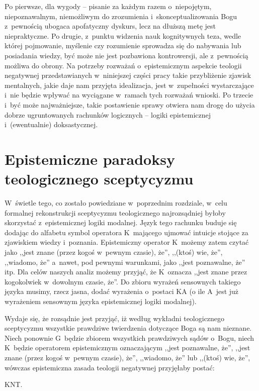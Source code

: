 Po pierwsze, dla wygody -- pisanie za każdym razem o~niepojętym, niepoznawalnym, niemożliwym do zrozumienia i~skonceptualizowania Bogu z~pewnością ubogaca apofatyczny dyskurs, lecz na dłuższą metę jest niepraktyczne. Po drugie, z~punktu widzenia nauk kognitywnych teza, wedle której pojmowanie, myślenie czy rozumienie sprowadza się do nabywania lub posiadania wiedzy, być może nie jest pozbawiona kontrowersji, ale z~pewnością możliwa do obrony. Na potrzeby rozważań o~epistemicznym aspekcie teologii negatywnej przedstawianych w~niniejszej części pracy takie przybliżenie zjawisk mentalnych, jakie daje nam przyjęta idealizacja, jest w~zupełności wystarczające i~nie będzie wpływać na wyciągane w~ramach tych rozważań wnioski. Po trzecie i~być może najważniejsze, takie postawienie sprawy otwiera nam drogę do użycia dobrze ugruntowanych rachunków logicznych -- logiki epistemicznej i~(ewentualnie) doksastycznej.


\chapter{Epistemiczne paradoksy teologicznego sceptycyzmu}

W~świetle tego, co zostało powiedziane w~poprzednim rozdziale, w~celu formalnej rekonstrukcji sceptycyzmu teologicznego najrozsądniej byłoby skorzystać z~epistemicznej logiki modalnej. Język tego rachunku buduje się dodając do alfabetu symbol operatora K~mającego ujmować intuicje stojące za zjawiskiem wiedzy i~poznania. Epistemiczny operator K~możemy zatem czytać jako ,,jest znane (przez kogoś w~pewnym czasie), że'', ,,(ktoś) wie, że'', ,,wiadomo, że'' a~nawet, pod pewnymi warunkami, jako ,,jest poznawalne, że'' itp. Dla celów naszych analiz możemy przyjąć, że K~oznacza ,,jest znane przez kogokolwiek w~dowolnym czasie, że''. Do zbioru wyrażeń sensownych takiego języka musimy, rzecz jasna, dodać wyrażenia o~postaci KA (o ile A~jest już wyrażeniem sensownym języka epistemicznej logiki modalnej).

Wydaje się, że rozsądnie jest przyjąć, iż według wykładni teologicznego sceptycyzmu wszystkie prawdziwe twierdzenia dotyczące Boga są nam nieznane. Niech ponownie G~będzie zbiorem wszystkich prawdziwych sądów o~Bogu, niech K~będzie operatorem epistemicznym oznaczającym ,,jest poznawalne, że'', ,,jest znane (przez kogoś w~pewnym czasie), że'', ,,wiadomo, że'' lub ,,(ktoś) wie, że'', wówczas epistemiczna zasada teologii negatywnej przyjęłaby postać:

KNT. \label{scep-par-preKNT}

